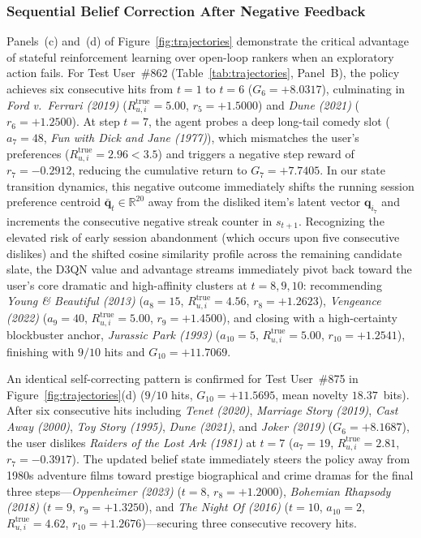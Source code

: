 \subsubsection{Sequential Belief Correction After Negative Feedback}
Panels~(c) and~(d) of Figure~\ref{fig:trajectories} demonstrate the critical advantage of stateful reinforcement learning over open-loop rankers when an exploratory action fails. For Test User~\#862 (Table~\ref{tab:trajectories}, Panel~B), the policy achieves six consecutive hits from $t=1$ to $t=6$ ($G_6 = +8.0317$), culminating in \textit{Ford v.\ Ferrari (2019)} ($R_{u,i}^{\text{true}} = 5.00$, $r_5 = +1.5000$) and \textit{Dune (2021)} ($r_6 = +1.2500$). At step $t=7$, the agent probes a deep long-tail comedy slot ($a_7 = 48$, \textit{Fun with Dick and Jane (1977)}), which mismatches the user's preferences ($R_{u,i}^{\text{true}} = 2.96 < 3.5$) and triggers a negative step reward of $r_7 = -0.2912$, reducing the cumulative return to $G_7 = +7.7405$. In our state transition dynamics, this negative outcome immediately shifts the running session preference centroid $\bar{\mathbf{q}}_t \in \mathbb{R}^{20}$ away from the disliked item's latent vector $\mathbf{q}_{i_7}$ and increments the consecutive negative streak counter in $s_{t+1}$. Recognizing the elevated risk of early session abandonment (which occurs upon five consecutive dislikes) and the shifted cosine similarity profile across the remaining candidate slate, the D3QN value and advantage streams immediately pivot back toward the user's core dramatic and high-affinity clusters at $t=8, 9, 10$: recommending \textit{Young \& Beautiful (2013)} ($a_8=15$, $R_{u,i}^{\text{true}}=4.56$, $r_8 = +1.2623$), \textit{Vengeance (2022)} ($a_9=40$, $R_{u,i}^{\text{true}}=5.00$, $r_9 = +1.4500$), and closing with a high-certainty blockbuster anchor, \textit{Jurassic Park (1993)} ($a_{10}=5$, $R_{u,i}^{\text{true}}=5.00$, $r_{10} = +1.2541$), finishing with $9/10$ hits and $G_{10} = +11.7069$.

An identical self-correcting pattern is confirmed for Test User~\#875 in Figure~\ref{fig:trajectories}(d) ($9/10$ hits, $G_{10} = +11.5695$, mean novelty $18.37$~bits). After six consecutive hits including \textit{Tenet (2020)}, \textit{Marriage Story (2019)}, \textit{Cast Away (2000)}, \textit{Toy Story (1995)}, \textit{Dune (2021)}, and \textit{Joker (2019)} ($G_6 = +8.1687$), the user dislikes \textit{Raiders of the Lost Ark (1981)} at $t=7$ ($a_7=19$, $R_{u,i}^{\text{true}} = 2.81$, $r_7 = -0.3917$). The updated belief state immediately steers the policy away from 1980s adventure films toward prestige biographical and crime dramas for the final three steps---\textit{Oppenheimer (2023)} ($t=8$, $r_8 = +1.2000$), \textit{Bohemian Rhapsody (2018)} ($t=9$, $r_9 = +1.3250$), and \textit{The Night Of (2016)} ($t=10$, $a_{10}=2$, $R_{u,i}^{\text{true}}=4.62$, $r_{10} = +1.2676$)---securing three consecutive recovery hits.

